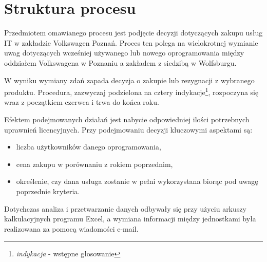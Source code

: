 \section{Struktura procesu}
Przedmiotem omawianego procesu jest podjęcie decyzji dotyczących zakupu usług IT w zakładzie Volkswagen Poznań. Proces ten polega na wielokrotnej wymianie uwag dotyczących wcześniej używanego lub nowego oprogramowania między oddziałem Volkswagena w Poznaniu a zakładem z siedzibą w Wolfsburgu.

W wyniku wymiany zdań zapada decyzja o zakupie lub rezygnacji z wybranego produktu. Procedura, zazwyczaj podzielona na cztery {indykacje}\footnote{\emph{indykacja}  - wstępne głosowanie}, rozpoczyna się wraz z początkiem czerwca i trwa do końca roku.

Efektem podejmowanych działań jest nabycie odpowiedniej ilości potrzebnych uprawnień licencyjnych. Przy
podejmowaniu decyzji kluczowymi aspektami są:
\begin{itemize}
    \item liczba użytkowników danego oprogramowania,
    \item cena zakupu w porównaniu z rokiem poprzednim,
    \item określenie, czy dana usługa zostanie w pełni wykorzystana biorąc pod uwagę poprzednie kryteria.
\end{itemize}
Dotychczas analiza i przetwarzanie danych odbywały się przy użyciu arkuszy kalkulacyjnych programu Excel, a wymiana informacji między jednostkami była realizowana za pomocą wiadomości e-mail.